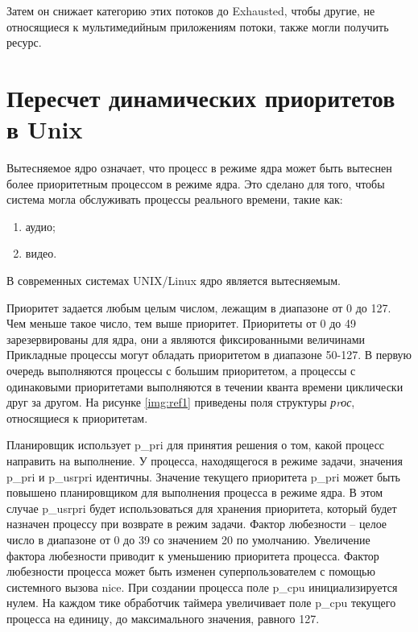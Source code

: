 \documentclass[a4paper,oneside,14pt]{extreport}
\begin{document}
Затем он снижает категорию этих потоков до Exhausted,
чтобы другие, не относящиеся к мультимедийным
приложениям потоки, также могли получить ресурс.

\section*{Пересчет динамических приоритетов в Unix}
Вытесняемое ядро означает, что процесс в режиме ядра 
может быть вытеснен более приоритетным процессом в режиме ядра.
Это сделано для того, 
чтобы система могла обслуживать процессы реального времени,
такие как:

\begin{enumerate}
	\item аудио;
	\item видео.
\end{enumerate}

В современных системах UNIX/Linux ядро является вытесняемым.

Приоритет задается любым целым числом, лежащим в диапазоне от 0 до 127. 
Чем меньше такое число, тем выше приоритет. 
Приоритеты от 0 до 49 зарезервированы для ядра, они а являются фиксированными величинами
Прикладные процессы могут обладать приоритетом в диапазоне 50-127.
В первую очередь выполняются процессы с большим приоритетом,
а процессы с одинаковыми приоритетами выполняются в течении кванта
времени циклически друг за другом. 
На рисунке \ref{img:ref1} приведены поля структуры \textit{рrос},
относящиеся к приоритетам.

\begin{figure}[ht!]
\end{figure}

Планировщик использует p\_pri для принятия решения о том,
какой процесс направить на выполнение.
У процесса, находящегося в режиме задачи, значения p\_pri и p\_usrpri идентичны.
Значение текущего приоритета p\_pri может быть повышено планировщиком для выполнения процесса в режиме ядра. 
В этом случае p\_usrpri будет использоваться для хранения приоритета, который будет назначен процессу
при возврате в режим задачи. 
Фактор любезности – целое число в диапазоне от 0 до 39 со значением
20 по умолчанию. Увеличение фактора любезности приводит к уменьшению 
приоритета процесса. Фактор любезности процесса может быть
изменен суперпользователем с помощью системного вызова nice.
При создании процесса поле p\_cpu инициализируется нулем. 
На каждом тике обработчик 
таймера увеличивает поле p\_cpu текущего процесса на единицу,
до максимального значения, 
равного 127.
\end{document}
